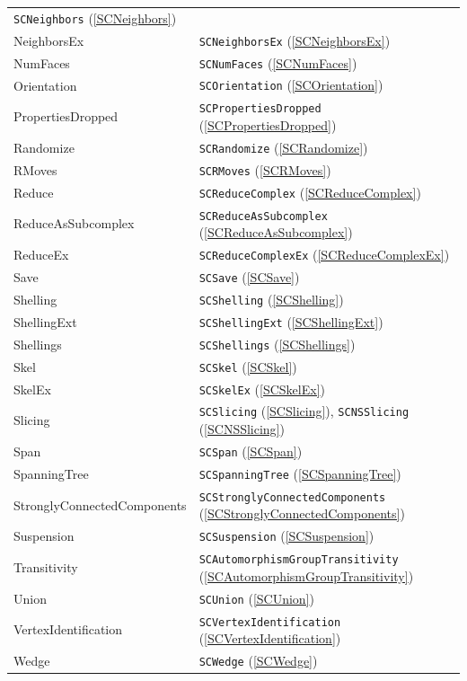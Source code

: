 \documentclass[a4paper,11pt]{report}
\begin{document}
{{\begin{center}
\begin{tabular}{ll}
\texttt{SCNeighbors} (\ref{SCNeighbors})\\
NeighborsEx&
\texttt{SCNeighborsEx} (\ref{SCNeighborsEx})\\
NumFaces&
\texttt{SCNumFaces} (\ref{SCNumFaces})\\
Orientation&
\texttt{SCOrientation} (\ref{SCOrientation})\\
PropertiesDropped&
\texttt{SCPropertiesDropped} (\ref{SCPropertiesDropped})\\
Randomize&
\texttt{SCRandomize} (\ref{SCRandomize})\\
RMoves&
\texttt{SCRMoves} (\ref{SCRMoves})\\
Reduce&
\texttt{SCReduceComplex} (\ref{SCReduceComplex})\\
ReduceAsSubcomplex&
\texttt{SCReduceAsSubcomplex} (\ref{SCReduceAsSubcomplex})\\
ReduceEx&
\texttt{SCReduceComplexEx} (\ref{SCReduceComplexEx})\\
Save&
\texttt{SCSave} (\ref{SCSave})\\
Shelling&
\texttt{SCShelling} (\ref{SCShelling})\\
ShellingExt&
\texttt{SCShellingExt} (\ref{SCShellingExt})\\
Shellings&
\texttt{SCShellings} (\ref{SCShellings})\\
Skel&
\texttt{SCSkel} (\ref{SCSkel})\\
SkelEx&
\texttt{SCSkelEx} (\ref{SCSkelEx})\\
Slicing&
\texttt{SCSlicing} (\ref{SCSlicing}), \texttt{SCNSSlicing} (\ref{SCNSSlicing})\\
Span&
\texttt{SCSpan} (\ref{SCSpan})\\
SpanningTree&
\texttt{SCSpanningTree} (\ref{SCSpanningTree})\\
StronglyConnectedComponents&
\texttt{SCStronglyConnectedComponents} (\ref{SCStronglyConnectedComponents})\\
Suspension&
\texttt{SCSuspension} (\ref{SCSuspension})\\
Transitivity&
\texttt{SCAutomorphismGroupTransitivity} (\ref{SCAutomorphismGroupTransitivity})\\
Union&
\texttt{SCUnion} (\ref{SCUnion})\\
VertexIdentification&
\texttt{SCVertexIdentification} (\ref{SCVertexIdentification})\\
Wedge&
\texttt{SCWedge} (\ref{SCWedge})\\
\end{tabular}\\[2mm]
\end{center}

}}
\end{document}
